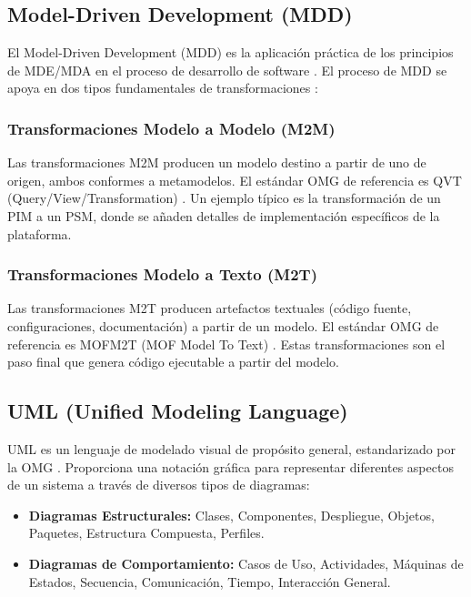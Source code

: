 \documentclass[12pt,a4paper]{article}
\begin{document}
\subsection{Model-Driven Development (MDD)}

El Model-Driven Development (MDD) es la aplicación práctica de los principios de MDE/MDA en el proceso de desarrollo de software \cite{selic2003}. El proceso de MDD se apoya en dos tipos fundamentales de transformaciones \cite{omg2008}:

\subsubsection{Transformaciones Modelo a Modelo (M2M)}

Las transformaciones M2M producen un modelo destino a partir de uno de origen, ambos conformes a metamodelos. El estándar OMG de referencia es QVT (Query/View/Transformation) \cite{omg2016}. Un ejemplo típico es la transformación de un PIM a un PSM, donde se añaden detalles de implementación específicos de la plataforma.

\subsubsection{Transformaciones Modelo a Texto (M2T)}

Las transformaciones M2T producen artefactos textuales (código fuente, configuraciones, documentación) a partir de un modelo. El estándar OMG de referencia es MOFM2T (MOF Model To Text) \cite{omg2008}. Estas transformaciones son el paso final que genera código ejecutable a partir del modelo.

\subsection{UML (Unified Modeling Language)}

UML es un lenguaje de modelado visual de propósito general, estandarizado por la OMG \cite{omg2017}. Proporciona una notación gráfica para representar diferentes aspectos de un sistema a través de diversos tipos de diagramas:

\begin{itemize}
    \item \textbf{Diagramas Estructurales:} Clases, Componentes, Despliegue, Objetos, Paquetes, Estructura Compuesta, Perfiles.
    \item \textbf{Diagramas de Comportamiento:} Casos de Uso, Actividades, Máquinas de Estados, Secuencia, Comunicación, Tiempo, Interacción General.
\end{itemize}
\end{document}
